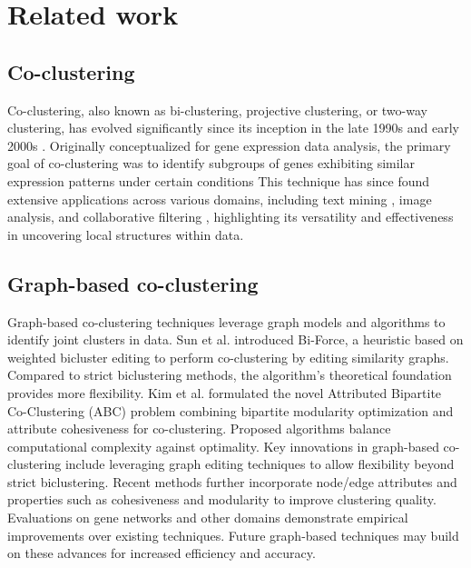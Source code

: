 

\section{Related work}

\subsection{Co-clustering}

Co-clustering, also known as bi-clustering, projective clustering, or two-way clustering, has evolved significantly since its inception in the late 1990s and early 2000s \cite{cheng2000BiclusteringExpressionData}.
Originally conceptualized for gene expression data analysis, the primary goal of co-clustering was to identify subgroups of genes exhibiting similar expression patterns under certain conditions \cite{madeira2004BiclusteringAlgorithmsBiological}
This technique has since found extensive applications across various domains, including text mining \cite{siklosi2012ContentbasedTrustBias, song2013ConstrainedTextCoclustering}, image analysis\cite{khan2020CoClusteringRevealSalient}, and collaborative filtering \cite{daruru2009PervasiveParallelismData}, highlighting its versatility and effectiveness in uncovering local structures within data.

\subsection{Graph-based co-clustering}

Graph-based co-clustering techniques leverage graph models and algorithms to identify joint clusters in data.
Sun et al.\cite{sun2014BiforceLargescaleBicluster} introduced Bi-Force, a heuristic based on weighted bicluster editing to perform co-clustering by editing similarity graphs. Compared to strict biclustering methods, the algorithm's theoretical foundation provides more flexibility.
Kim et al.\cite{kim2022ABCAttributedBipartite} formulated the novel Attributed Bipartite Co-Clustering (ABC) problem combining bipartite modularity optimization and attribute cohesiveness for co-clustering. Proposed algorithms balance computational complexity against optimality.
Key innovations in graph-based co-clustering include leveraging graph editing techniques to allow flexibility beyond strict biclustering. Recent methods further incorporate node/edge attributes and properties such as cohesiveness and modularity to improve clustering quality. Evaluations on gene networks and other domains demonstrate empirical improvements over existing techniques. Future graph-based techniques may build on these advances for increased efficiency and accuracy.

